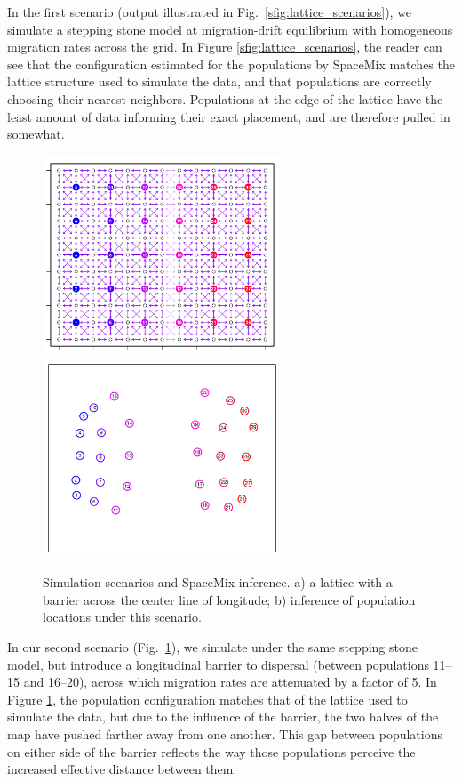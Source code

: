 \documentclass[12pt]{article}
\begin{document}
In the first scenario (output illustrated in Fig.\ \ref{sfig:lattice_scenarios}), we simulate a stepping stone model at migration-drift equilibrium with homogeneous migration rates across the grid. In Figure \ref{sfig:lattice_scenarios}, the reader can see that the configuration estimated for the populations by SpaceMix matches the lattice structure used to simulate the data, and that populations are correctly choosing their nearest neighbors.  Populations at the edge of the lattice have the least amount of data informing their exact placement, and are therefore pulled in somewhat.

\begin{figure}
	\centering
			{\includegraphics[width=2.8in,height=2.33in]{figs/sims/barrier_lattice.png}}
			{\includegraphics[width=2.8in,height=2.33in]{figs/sims/GeoGenMap_barrier.pdf}}
	\caption{Simulation scenarios and SpaceMix inference.  a) a lattice with a barrier across the center line of longitude; b) inference of population locations under this scenario.}\label{sfig:barrier_scenarios}
\end{figure}

In our second scenario (Fig.\ \ref{sfig:barrier_scenarios}), we simulate under the same stepping stone model, but introduce a longitudinal barrier to dispersal (between populations 11--15 and 16--20), across which migration rates are attenuated by a factor of 5.  In Figure \ref{sfig:barrier_scenarios}, the population configuration matches that of the lattice used to simulate the data, but due to the influence of the barrier, the two halves of the map have pushed farther away from one another.  This gap between populations on either side of the barrier reflects the way those populations perceive the increased effective distance between them.
\end{document}
